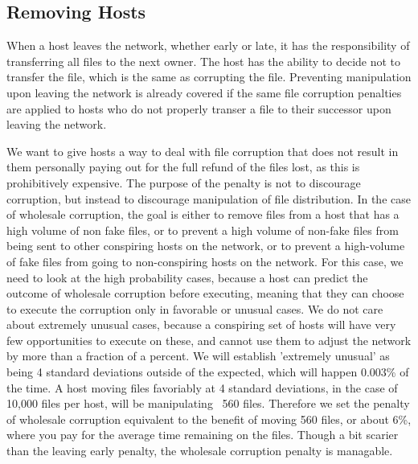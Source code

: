 \documentclass[twocolumn]{article}
\begin{document}
\subsection{Removing Hosts}
When a host leaves the network, whether early or late, it has the responsibility of transferring all files to the next owner.
The host has the ability to decide not to transfer the file, which is the same as corrupting the file.
Preventing manipulation upon leaving the network is already covered if the same file corruption penalties are applied to hosts who do not properly transer a file to their successor upon leaving the network.

We want to give hosts a way to deal with file corruption that does not result in them personally paying out for the full refund of the files lost, as this is prohibitively expensive.
The purpose of the penalty is not to discourage corruption, but instead to discourage manipulation of file distribution.
In the case of wholesale corruption, the goal is either to remove files from a host that has a high volume of non fake files, or to prevent a high volume of non-fake files from being sent to other conspiring hosts on the network, or to prevent a high-volume of fake files from going to non-conspiring hosts on the network.
For this case, we need to look at the high probability cases, because a host can predict the outcome of wholesale corruption before executing, meaning that they can choose to execute the corruption only in favorable or unusual cases.
We do not care about extremely unusual cases, because a conspiring set of hosts will have very few opportunities to execute on these, and cannot use them to adjust the network by more than a fraction of a percent.
We will establish 'extremely unusual' as being 4 standard deviations outside of the expected, which will happen 0.003\% of the time.
A host moving files favoriably at 4 standard deviations, in the case of 10,000 files per host, will be manipulating ~560 files.
Therefore we set the penalty of wholesale corruption equivalent to the benefit of moving 560 files, or about 6\%, where you pay for the average time remaining on the files.
Though a bit scarier than the leaving early penalty, the wholesale corruption penalty is managable.
\end{document}
